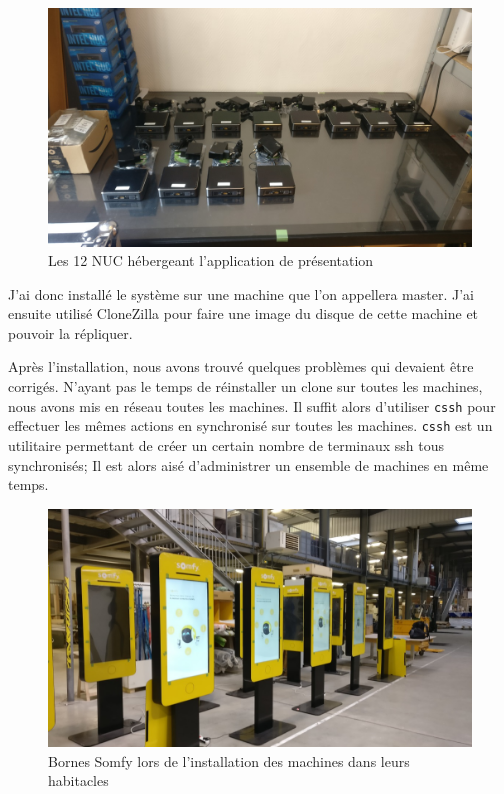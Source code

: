 \begin{figure}[h]
    \centering
    \includegraphics[scale=0.4]{img/somfy-nuc.jpg}
    \caption{Les 12 NUC hébergeant l'application de présentation}
\end{figure}

J'ai donc installé le système sur une machine que l'on appellera master.
J'ai ensuite utilisé CloneZilla pour faire une image du disque de cette machine et pouvoir la répliquer.

Après l'installation, nous avons trouvé quelques problèmes qui devaient être corrigés.
N'ayant pas le temps de réinstaller un clone sur toutes les machines, nous avons mis en réseau toutes les machines.
Il suffit alors d'utiliser \texttt{cssh} pour effectuer les mêmes actions en synchronisé sur toutes les machines.
\texttt{cssh} est un utilitaire permettant de créer un certain nombre de terminaux ssh tous synchronisés;
Il est alors aisé d'administrer un ensemble de machines en même temps.

\begin{figure}[h]
    \centering
    \includegraphics[scale=0.4]{img/somfy-install.jpg}
    \caption{Bornes Somfy lors de l'installation des machines dans leurs habitacles}
\end{figure}

